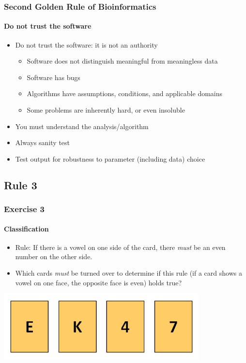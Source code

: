 \documentclass[table]{beamer}
\begin{document}
  \begin{frame}
    \frametitle{Second Golden Rule of Bioinformatics}
    \framesubtitle{Do not trust the software}
	\begin{itemize}
	  \item Do not trust the software: it is not an authority
	  \begin{itemize}
	    \item Software does not distinguish meaningful from meaningless data
	    \item Software has bugs
	    \item Algorithms have assumptions, conditions, and applicable domains
	    \item Some problems are inherently hard, or even insoluble
	  \end{itemize}
	  \item You must understand the analysis/algorithm
	  \item Always sanity test
	  \item Test output for robustness to parameter (including data) choice
	\end{itemize}
  \end{frame}

  \subsection{Rule 3}  
  \begin{frame}
    \frametitle{Exercise 3}
    \framesubtitle{Classification}
    \begin{itemize}
      \item Rule: If there is a vowel on one side of the card, there \textit{must} be an even number on the other side.
      \item Which cards \textit{must} be turned over to determine if this rule (if a card shows a vowel on one face, the opposite face is even) holds true?
    \end{itemize}
    \includegraphics[width=0.8\textwidth]{images/wason}
  \end{frame}
\end{document}
